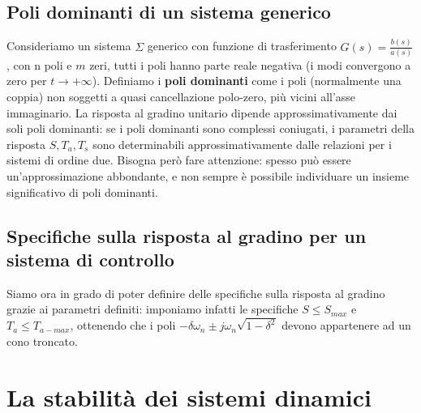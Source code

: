 \documentclass[11pt]{article}
\begin{document}
\subsection{Poli dominanti di un sistema generico}
Consideriamo un sistema $\Sigma$ generico con funzione di trasferimento $G(s)=\frac{b(s)}{a(s)}$, con n poli e $m$ zeri, tutti i poli hanno parte reale negativa (i modi convergono a zero per $t\rightarrow+\infty$). Definiamo i \textbf{poli dominanti} come i poli (normalmente una coppia) non soggetti a quasi cancellazione polo-zero, più vicini all'asse immaginario. La risposta al gradino unitario dipende approssimativamente dai soli poli dominanti: se i poli dominanti sono complessi coniugati, i parametri della risposta $S, T_a, T_s$ sono determinabili approssimativamente dalle relazioni per i sistemi di ordine due. Bisogna però fare attenzione: spesso può essere un'approssimazione abbondante, e non sempre è possibile individuare un insieme significativo di poli dominanti.
\subsection{Specifiche sulla risposta al gradino per un sistema di controllo}
Siamo ora in grado di poter definire delle specifiche sulla risposta al gradino grazie ai parametri definiti: imponiamo infatti le specifiche $S \le S_{max}$ e $T_a \le T_{a-max}$, ottenendo che i poli $-\delta\omega_n \pm j\omega_n \sqrt{1-\delta^2}$ devono appartenere ad un cono troncato.

\section{La stabilità dei sistemi dinamici}
\end{document}
